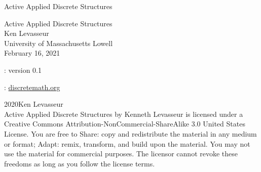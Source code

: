 \documentclass[oneside,10pt,]{book}
\newcommand{\titlepagefont}{\relax}
\numberwithin{equation}{section}
\begin{document}
\frontmatter
\thispagestyle{empty}
{\titlepagefont\centering
\vspace*{0.28\textheight}
{\Huge Active Applied Discrete Structures}\\}
\clearpage
\thispagestyle{empty}
{\titlepagefont\centering
\vspace*{0.14\textheight}
{\Huge Active Applied Discrete Structures}\\[3\baselineskip]
{\Large Ken Levasseur}\\[0.5\baselineskip]
{\Large University of Massachusetts Lowell}\\[3\baselineskip]
{\Large February 16, 2021}\\}
\clearpage
\thispagestyle{empty}
\hypertarget{g:colophon:idm19610648256}{}
: version 0.1\par\medskip
{}: \href{http:\slash{}\slash{}discretemath.org}{discretemath.org}\par\medskip
\noindent\textcopyright{}2020\quad{}Ken Levasseur\\[0.5\baselineskip]
Active Applied Discrete Structures by Kenneth Levasseur is licensed under a Creative Commons Attribution-NonCommercial-ShareAlike 3.0 United States License. You are free to Share: copy and redistribute the material in any medium or format; Adapt: remix, transform, and build upon the material. You may not use the material for commercial purposes.  The licensor cannot revoke these freedoms as long as you follow the license terms.\par\medskip
{}
\null\clearpage
%
%
\typeout{************************************************}
\typeout{************************************************}
%
\end{document}
